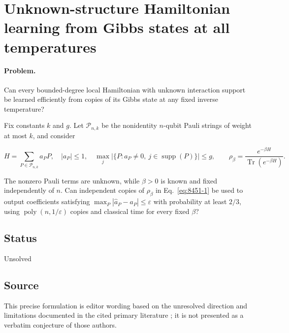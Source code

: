 \section{Unknown-structure Hamiltonian learning from Gibbs states at all temperatures}
\label{sec:op_845158213592821f}

\paragraph{Problem.}
Can every bounded-degree local Hamiltonian with unknown interaction support be learned efficiently from copies of its Gibbs state at any fixed inverse temperature?

Fix constants $k$ and $g$. Let $\mathcal P_{n,k}$ be the nonidentity $n$-qubit Pauli strings of weight at most $k$, and consider

\begin{equation}
H=\sum_{P\in\mathcal P_{n,k}}a_PP,
\quad |a_P|\leq1,
\quad \max_j|\{P:a_P\neq0,\ j\in\operatorname{supp}(P)\}|\leq g,
\qquad
\rho_\beta=\frac{e^{-\beta H}}{\operatorname{Tr}(e^{-\beta H})}.
\label{eq:8451-1}
\end{equation}

The nonzero Pauli terms are unknown, while $\beta>0$ is known and fixed independently of $n$. Can independent copies of $\rho_\beta$ in Eq.~\eqref{eq:8451-1} be used to output coefficients satisfying $\max_P|\widehat a_P-a_P|\leq\varepsilon$ with probability at least $2/3$, using $\operatorname{poly}(n,1/\varepsilon)$ copies and classical time for every fixed $\beta$?

\subsection*{Status}

Unsolved

\subsection*{Source}

This precise formulation is editor wording based on the unresolved direction and limitations documented in the cited primary literature ; it is not presented as a verbatim conjecture of those authors.

